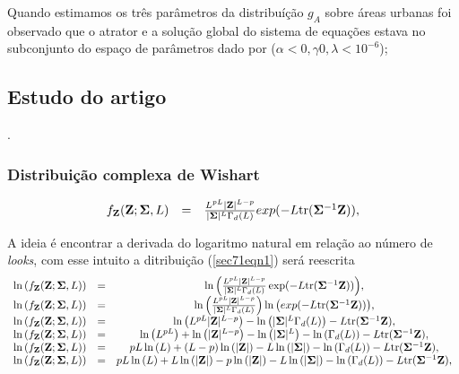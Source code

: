 \documentclass[12pt,a4paper]{article}
\begin{document}
Quando estimamos os três parâmetros da distribuíção $g_A$ sobre áreas urbanas foi observado que o atrator e a solução global do sistema de equações estava  no subconjunto do espaço de parâmetros dado por ($\alpha<0,\gamma0,\lambda<10^{-6}$); 

\subsection{Estudo do artigo  \cite{frery_nascimento_2014}}.

\subsubsection{Distribuição complexa de Wishart}

\begin{equation}\label{sec71eqn1}
\begin{array}{ccc}
	f_{{\bf Z}}({\bf Z};{\bf \Sigma},L)&=&\frac{L^{pL}|{\bf Z}|^{L-p}}{|{\bf \Sigma}|^{L}\Gamma_d(L)} exp(-L\mathrm{tr}{({\bf \Sigma}^{-1}{\bf Z})}), \\
\end{array}
\end{equation}

A ideia é encontrar a derivada do logaritmo natural em relação ao número de {\it looks}, com esse intuito a ditribuição (\ref{sec71eqn1}) será reescrita
\begin{equation}\label{sec71eqn2}
\begin{array}{ccc}
	\ln{\left(f_{{\bf Z}}({\bf Z};{\bf \Sigma},L)\right)}&=&\ln{\left(\frac{L^{pL}|{\bf Z}|^{L-p}}{|{\bf \Sigma}|^{L}\Gamma_d(L)} \exp(-L\mathrm{tr}{({\bf \Sigma}^{-1}{\bf Z})})\right)}, \\
	\ln{\left(f_{{\bf Z}}({\bf Z};{\bf \Sigma},L)\right)}&=&\ln{\left(\frac{L^{pL}|{\bf Z}|^{L-p}}{|{\bf \Sigma}|^{L}\Gamma_d(L)}\right)}\ln{\left( exp(-L\mathrm{tr}{({\bf \Sigma}^{-1}{\bf Z})})\right)}, \\
	\ln{\left(f_{{\bf Z}}({\bf Z};{\bf \Sigma},L)\right)}&=&\ln{\left(L^{pL}|{\bf Z}|^{L-p}\right)} - \ln{\left(|{\bf \Sigma}|^{L}\Gamma_d(L)\right)}-L\mathrm{tr}{({\bf \Sigma}^{-1}{\bf Z})}, \\
	\ln{\left(f_{{\bf Z}}({\bf Z};{\bf \Sigma},L)\right)}&=&\ln{\left(L^{pL}\right)}+\ln{\left( |{\bf Z}|^{L-p}\right)} - \ln{\left(|{\bf \Sigma}|^{L}\right)}-\ln{\left(\Gamma_d(L)\right)}-L\mathrm{tr}{({\bf \Sigma}^{-1}{\bf Z})}, \\
	\ln{\left(f_{{\bf Z}}({\bf Z};{\bf \Sigma},L)\right)}&=&pL\ln{\left(L\right)}+(L-p)\ln{\left( |{\bf Z}|\right)} - L\ln{\left(|{\bf \Sigma}|\right)}-\ln{\left(\Gamma_d(L)\right)}-L\mathrm{tr}{({\bf \Sigma}^{-1}{\bf Z})}, \\
	\ln{\left(f_{{\bf Z}}({\bf Z};{\bf \Sigma},L)\right)}&=&pL\ln{\left(L\right)}+L\ln{\left( |{\bf Z}|\right)}-p\ln{\left( |{\bf Z}|\right)}- L\ln{\left(|{\bf \Sigma}|\right)}-\ln{\left(\Gamma_d(L)\right)}-L\mathrm{tr}{({\bf \Sigma}^{-1}{\bf Z})}, \\
\end{array}
\end{equation}
\end{document}
